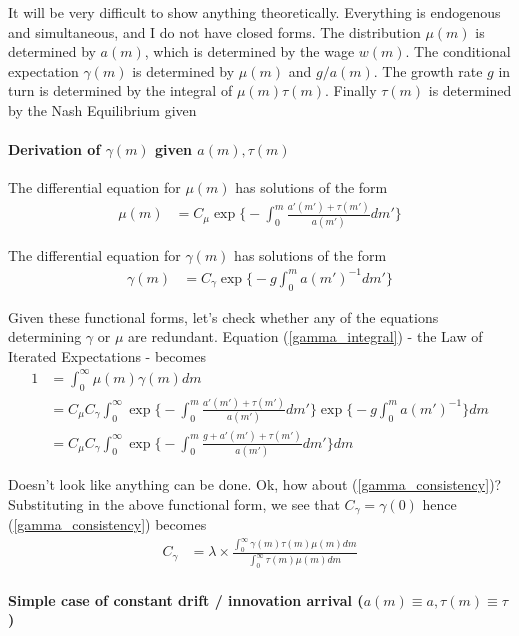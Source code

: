 \documentclass[12pt,english]{article}
\theoremstyle{remark}
\begin{document}
It will be very difficult to show anything theoretically. Everything is endogenous and simultaneous, and I do not have closed forms. The distribution $\mu(m)$ is determined by $a(m)$, which is determined by the wage $w(m)$. The conditional expectation $\gamma(m)$ is determined by $\mu(m)$ and $g/a(m)$. The growth rate $g$ in turn is determined by the integral of $\mu(m)\tau(m)$. Finally $\tau(m)$ is determined by the Nash Equilibrium given 

\paragraph{Derivation of $\gamma(m)$ given $a(m),\tau(m)$}
The differential equation for $\mu(m)$ has solutions of the form
\begin{align*}
	\mu(m) &= C_{\mu}\exp\Bigg\{ - \int_0^m \frac{a'(m') + \tau(m')}{a(m')} dm'\Bigg\}
\end{align*}

The differential equation for $\gamma(m)$ has solutions of the form
\begin{align*}
	\gamma(m) &= C_{\gamma} \exp\Bigg\{ -g \int_0^m a(m')^{-1} dm' \Bigg\}
\end{align*}

Given these functional forms, let's check whether any of the equations determining $\gamma$ or $\mu$ are redundant. Equation (\ref{gamma_integral}) - the Law of Iterated Expectations - becomes
\begin{align*}
	1 &= \int_{0}^{\infty} \mu(m) \gamma(m) dm \\
	  &= C_{\mu} C_{\gamma} \int_0^{\infty} \exp\Big\{ - \int_0^m \frac{a'(m') + \tau(m')}{a(m')} dm' \Big\} \exp\Big\{ -g \int_{0}^{m} a(m')^{-1}  \Big\} dm \\
	  &= C_{\mu} C_{\gamma} \int_0^{\infty} \exp\Big\{ - \int_0^m \frac{g + a'(m') + \tau(m')}{a(m')} dm' \Big\} dm
\end{align*}

Doesn't look like anything can be done. Ok, how about (\ref{gamma_consistency})? Substituting in the above functional form, we see that $C_{\gamma} = \gamma(0)$ hence (\ref{gamma_consistency}) becomes
\begin{align*}
	C_{\gamma} &=  \lambda \times \frac{\int_{0}^{\infty} \gamma(m) \tau(m) \mu(m) dm}{\int_{0}^{\infty}\tau(m) \mu(m) dm}
\end{align*}

\paragraph{Simple case of constant drift / innovation arrival ($a(m) \equiv a, \tau(m) \equiv \tau$)}
\end{document}
